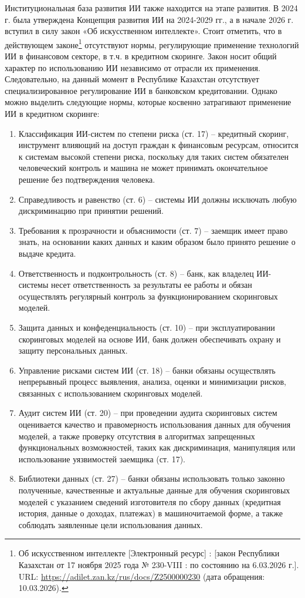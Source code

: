 Институциональная база развития ИИ также находится на этапе развития. В 2024 г. была утверждена Концепция развития ИИ на 2024-2029 гг., а в начале 2026 г. вступил в силу закон «Об искусственном интеллекте». Стоит отметить, что в действующем законе\footnote{Об искусственном интеллекте [Электронный ресурс] : [закон Республики Казахстан от 17 ноября 2025 года № 230-VIII : по состоянию на 6.03.2026 г.]. URL: \url{https://adilet.zan.kz/rus/docs/Z2500000230} (дата обращения: 10.03.2026).} отсутствуют нормы, регулирующие применение технологий ИИ в финансовом секторе, в т.ч. в кредитном скоринге. Закон носит общий характер по использованию ИИ независимо от отрасли их применения. Следовательно, на данный момент в Республике Казахстан отсутствует специализированное регулирование ИИ в банковском кредитовании. Однако можно выделить следующие нормы, которые косвенно затрагивают применение ИИ в кредитном скоринге:
\begin{enumerate}[nosep]
	\item Классификация ИИ-систем по степени риска (ст. 17) -- кредитный скоринг, инструмент влияющий на доступ граждан к финансовым ресурсам, относится к системам высокой степени риска, поскольку для таких систем обязателен человеческий контроль и машина не может принимать окончательное решение без подтверждения человека.
	\item Справедливость и равенство (ст. 6) --  системы ИИ должны исключать любую дискриминацию при принятии решений.
	\item Требования к прозрачности и объяснимости (ст. 7) -- заемщик имеет право знать, на основании каких данных и каким образом было принято решение о выдаче кредита.
	\item Ответственность и подконтрольность (ст. 8) -- банк, как владелец ИИ-системы несет ответственность за результаты ее работы и обязан осуществлять регулярный контроль за функционированием скоринговых моделей.
	\item Защита данных и конфеденциальность (ст. 10) -- при эксплуатировании скоринговых моделей на основе ИИ, банк должен обеспечивать охрану и защиту персональных данных.
	\item Управление рисками систем ИИ (ст. 18) -- банки обязаны осуществлять непрерывный процесс выявления, анализа, оценки и минимизации рисков, связанных с использованием скоринговых моделей.
	\item Аудит систем ИИ (ст. 20) -- при проведении аудита скоринговых систем оценивается качество и правомерность использования данных для обучения моделей, а также проверку отсутствия в алгоритмах запрещенных функциональных возможностей, таких как дискриминация, манипуляция или использование уязвимостей заемщика (ст. 17).
	\item Библиотеки данных (ст. 27) -- банки обязаны использовать только законно полученные, качественные и актуальные данные для обучения скоринговых моделей с указанием сведений изготовителя по сбору данных (кредитная история, данные о доходах, платежах) в машиночитаемой форме, а также соблюдать заявленные цели использования данных.
\end{enumerate}

